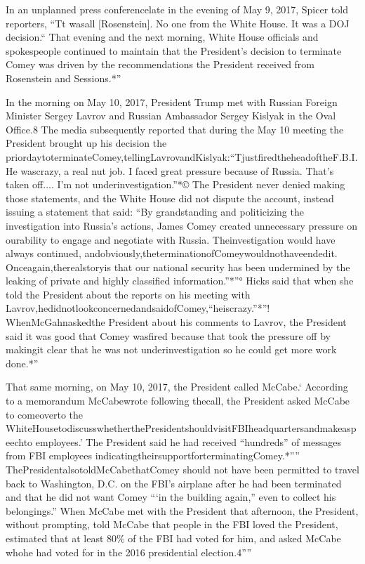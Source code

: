 {In an unplanned press conferencelate in the evening of May 9, 2017, Spicer told reporters, “Tt wasall [Rosenstein]. No one from the White House. It was a DOJ decision.“ That evening and the next morning, White House officials and spokespeople continued to maintain that the President’s decision to terminate Comey was driven by the recommendations the President received from Rosenstein and Sessions.*”

In the morning on May 10, 2017, President Trump met with Russian Foreign Minister Sergey Lavrov and Russian Ambassador Sergey Kislyak in the Oval Office.8 The media subsequently reported that during the May 10 meeting the President brought up his decision the priordaytoterminateComey,tellingLavrovandKislyak:“TjustfiredtheheadoftheF.B.I. He wascrazy, a real nut job. I faced great pressure because of Russia. That’s taken off.... I’m not underinvestigation.”*© The President never denied making those statements, and the White House did not dispute the account, instead issuing a statement that said: “By grandstanding and politicizing the investigation into Russia’s actions, James Comey created unnecessary pressure on ourability to engage and negotiate with Russia. Theinvestigation would have always continued, andobviously,theterminationofComeywouldnothaveendedit. Onceagain,therealstoryis that our national security has been undermined by the leaking of private and highly classified information.”*”° Hicks said that when she told the President about the reports on his meeting with Lavrov,hedidnotlookconcernedandsaidofComey,“heiscrazy.”*”! WhenMcGahnaskedthe President about his comments to Lavrov, the President said it was good that Comey wasfired because that took the pressure off by makingit clear that he was not underinvestigation so he could get more work done.*”

That same morning, on May 10, 2017, the President called McCabe.‘ According to a memorandum McCabewrote following thecall, the President asked McCabe to comeoverto the WhiteHousetodiscusswhetherthePresidentshouldvisitFBIheadquartersandmakeaspeechto employees.’ The President said he had received “hundreds” of messages from FBI employees indicatingtheirsupportforterminatingComey.*”” ThePresidentalsotoldMcCabethatComey should not have been permitted to travel back to Washington, D.C. on the FBI’s airplane after he had been terminated and that he did not want Comey “‘in the building again,” even to collect his belongings.” When McCabe met with the President that afternoon, the President, without prompting, told McCabe that people in the FBI loved the President, estimated that at least 80\% of the FBI had voted for him, and asked McCabe whohe had voted for in the 2016 presidential election.4””

}
